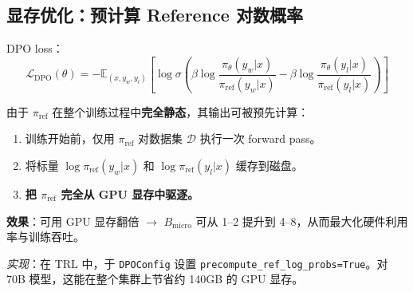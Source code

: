 \subsection{显存优化：预计算 Reference 对数概率}
\label{vram-optimization-pre-computing-reference-log-probabilities}

DPO loss：
\begin{equation}
\mathcal{L}_{\text{DPO}}(\theta) = -\mathbb{E}_{(x, y_w, y_l)}\!\left[\log \sigma\!\left(\beta \log \frac{\pi_\theta(y_w|x)}{\pi_{\text{ref}}(y_w|x)} - \beta \log \frac{\pi_\theta(y_l|x)}{\pi_{\text{ref}}(y_l|x)}\right)\right]
\end{equation}

由于 $\pi_{\text{ref}}$ 在整个训练过程中\textbf{完全静态}，其输出可被预先计算：

\begin{keybox}
\begin{enumerate}
  \item 训练开始前，仅用 $\pi_{\text{ref}}$ 对数据集 $\mathcal{D}$ 执行一次 forward pass。
  \item 将标量 $\log \pi_{\text{ref}}(y_w|x)$ 和 $\log \pi_{\text{ref}}(y_l|x)$ 缓存到磁盘。
  \item \textbf{把 $\pi_{\text{ref}}$ 完全从 GPU 显存中驱逐。}
\end{enumerate}

\textbf{效果}：可用 GPU 显存翻倍 $\rightarrow$ $B_{\text{micro}}$ 可从 1--2 提升到 4--8，从而最大化硬件利用率与训练吞吐。

\emph{实现}：在 TRL 中，于 \texttt{DPOConfig} 设置 \texttt{precompute\_ref\_log\_probs=True}。对 70B 模型，这能在整个集群上节省约 140GB 的 GPU 显存。
\end{keybox}

